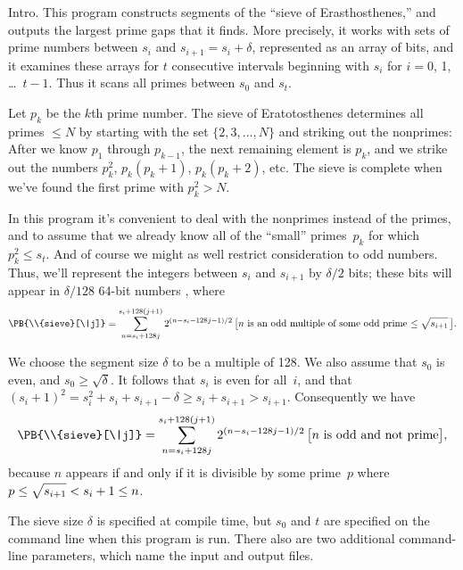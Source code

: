 
\srcloctrue
\datethis

Intro. This program constructs segments of the ``sieve
of Erasthosthenes,''
and outputs the largest prime gaps that it finds. More precisely, it
works with sets of prime numbers between $s_i$ and $s_{i+1}=s_i+\delta$,
represented as an array of bits, and it examines these arrays for
$t$ consecutive intervals beginning with $s_i$ for $i=0$, 1, \dots~$t-1$.
Thus it scans all primes between $s_0$ and $s_t$.

Let $p_k$ be the $k$th prime number. The sieve of Eratotosthenes determines
all primes $\le N$ by starting with the set $\{2,3,\ldots,N\}$ and striking
out the nonprimes: After we know $p_1$ through $p_{k-1}$, the next remaining
element is $p_k$, and we strike out the numbers $p_k^2$, $p_k(p_k+1)$,
$p_k(p_k+2)$, etc. The sieve is complete when we've found the
first prime with $p_k^2>N$.

In this program it's convenient to deal with the nonprimes instead of the
primes, and to assume that we already know all of the ``small'' primes~$p_k$
for which $p_k^2\le s_t$.
And of course we might as well restrict consideration to odd numbers.
Thus, we'll represent the integers between $s_i$ and $s_{i+1}$ by
$\delta/2$ bits; these bits will appear in $\delta/128$ 64-bit numbers
, where
$$\PB{\\{sieve}[\|j]}=\sum_{n=s_i+128j}^{s_i+128(j+1)} 2^{(n-s_i-128j-1)/2}
\,\hbox{$\bigl[n$ is an odd multiple of some odd prime
$\le\sqrt{\mathstrut s_{i+1}}\,\bigr]$}.$$

We choose the segment size $\delta$ to be a multiple of 128.
We also assume that $s_0$ is even, and $s_0\ge\sqrt\delta$. It follows
that $s_i$ is even for all~$i$, and that $(s_i+1)^2=s_i^2+s_i+s_{i+1}-\delta
\ge s_i+s_{i+1}>s_{i+1}$. Consequently we have
$$\PB{\\{sieve}[\|j]}=\sum_{n=s_i+128j}^{s_i+128(j+1)} 2^{(n-s_i-128j-1)/2}
\,\hbox{$\bigl[n$ is odd and not prime$\bigr]$},$$
because $n$ appears if and only if it is divisible by some prime~$p$
where $p\le\sqrt{\mathstrut s_{i+1}}<s_i+1\le n$.

\fi

The sieve size $\delta$ is specified at compile time,
but $s_0$ and $t$ are specified on the command line when this program
is run. There also are two additional command-line parameters,
which name the input and output files.

